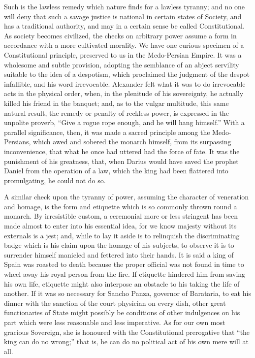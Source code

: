 Such is the lawless remedy which nature finds for
a lawless tyranny; and no one will deny that such a savage justice is
national in certain states of Society, and has a traditional
authority, and may in a certain sense be called Constitutional. As
society becomes civilized, the checks on arbitrary power assume a form
in accordance with a more cultivated morality. We have one curious
specimen of a Constitutional principle, preserved to us in the Medo-Persian
Empire. It was a wholesome and subtle provision, adopting the
semblance of an abject servility suitable to the idea of a despotism,
which proclaimed the judgment of the despot infallible, and his word
irrevocable. Alexander felt what it was to do irrevocable acts
in the physical order, when, in the plenitude of his sovereignty, he
actually killed his friend in the banquet; and, as to the vulgar
multitude, this same natural result, the remedy or penalty of reckless
power, is expressed in the unpolite proverb, ``Give a rogue rope
enough, and he will hang himself.'' With a parallel significance, then,
it was made a sacred principle among the Medo-Persians, which awed and
sobered the monarch himself, from its surpassing inconvenience, that
what he once had uttered had the force of fate. It was the punishment
of his greatness, that, when Darius would have saved the prophet
Daniel from the operation of a law, which the king had been flattered
into promulgating, he could not do so.

A similar check upon the tyranny of power,
assuming the character of veneration and homage, is the form and
etiquette which is so commonly thrown round a monarch. By irresistible
custom, a ceremonial more or less stringent has been made almost to
enter into his essential idea, for we know majesty without its
externals is a jest; and, while to lay it aside is to relinquish the
discriminating badge which is his claim upon the homage of his
subjects, to observe it is to surrender himself manicled and fettered
into their hands. It is said a king of Spain was roasted to death
because the proper official was not found in time to wheel away his
royal person from the fire. If etiquette hindered him from saving his
own life, etiquette might also interpose an obstacle to his taking the
life of another. If it was so necessary for Sancho Panza, governor of
Barataria, to eat his dinner with the sanction of the court physician
on every dish, other great functionaries of State might possibly be
conditions of other indulgences on his part which were less reasonable
and less imperative. As for our own most gracious Sovereign, she
is honoured with the Constitutional prerogative that ``the king can do
no wrong;'' that is, he can do no political act of his own mere will at
all.


